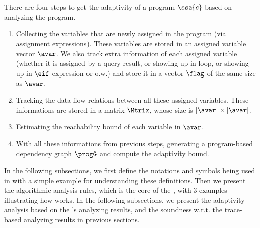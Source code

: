 
\section{\THESYSTEM}
There are four steps to get the adaptivity of a program $\ssa{c}$ based on analyzing the program. 
\begin{enumerate}
    \item Collecting the variables that are newly assigned in the program (via assignment expressions). These variables are stored in an assigned variable vector $\avar$. 
    We also track extra information of each assigned variable (whether it is assigned by a query result, or showing up in loop, or showing up in $\eif$ expression or o.w.) and store it in a vector $\flag$ of the same size as $\avar$.
    \item Tracking the data flow relations between all these assigned variables. These informations are stored in a matrix $\Mtrix$, whose size is $|\avar| \times |\avar|$. 
    \item Estimating the reachability bound of each variable in $\avar$.
    \item With all these informations from previous steps, generating a program-based dependency graph $\progG$ and compute the adaptivity bound.
\end{enumerate}

In the following subsections, 
we first define the notations and symbols being used in \THESYSTEM  with a simple example for understanding these definitions. 
Then we present the algorithmic analysis rules, which is the core of the \THESYSTEM, with
3 examples illustrating how \THESYSTEM  works.
In the following subsections, we present the adaptivity analysis based on the \THESYSTEM's analyzing results, and the soundness w.r.t. the trace-based analyzing results in previous sections.

